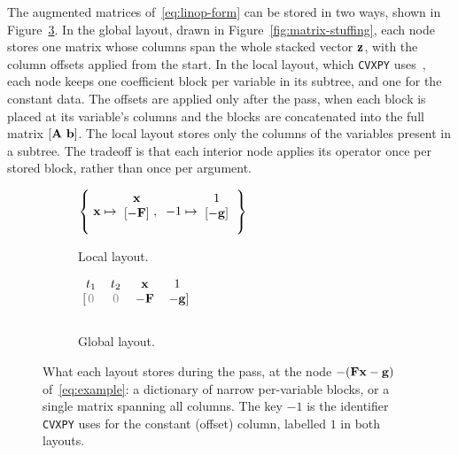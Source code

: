 The augmented matrices of~\eqref{eq:linop-form} can be stored in two ways,
shown in Figure~\ref{fig:local-vs-global}. In the global layout, drawn in
Figure~\ref{fig:matrix-stuffing}, each node stores one matrix whose columns span the whole
stacked vector $\mathbf{z}$, with the column offsets applied from the start. In the local
layout, which \texttt{CVXPY} uses~\cite{cvxpy2026source}, each node keeps one coefficient block
per variable in its
subtree, and one for the constant data. The offsets are applied only after the pass, when
each block is placed at its variable's columns and the blocks are concatenated into the full
matrix $[\mmat{A}\ \mvec{b}]$. The local layout stores only the columns of the variables
present in a subtree. The tradeoff is that each interior node applies its operator once per
stored block, rather than once per argument.

\begin{figure}[htbp]
\begin{subfigure}{0.48\textwidth}
\centering
$
\left\{\;
\mvec{x} \mapsto
\begin{blockarray}{c}
\mvec{x} \\
\begin{block}{[c]}
-\mmat{F} \\
\end{block}
\end{blockarray}
,\;\;
-1 \mapsto
\begin{blockarray}{c}
1 \\
\begin{block}{[c]}
-\mvec{g} \\
\end{block}
\end{blockarray}
\;\right\}
$
\caption{Local layout.}
\label{fig:local-layout}
\end{subfigure}
\hfill
\begin{subfigure}{0.48\textwidth}
\centering
$
\begin{blockarray}{cccc}
t_1        & t_2        & \mvec{x}  & 1  \\
\begin{block}{[cccc]}
\plotzero  & \plotzero  & -\mmat{F} & -\mvec{g} \\
\end{block}
\end{blockarray}
$
\caption{Global layout.}
\label{fig:global-layout}
\end{subfigure}
\caption{What each layout stores during the pass, at the node $-(\mathbf{F}\mathbf{x} - \mathbf{g})$
of~\eqref{eq:example}:
a dictionary of narrow per-variable blocks, or a single matrix spanning
all columns. The key $-1$ is the identifier \texttt{CVXPY} uses for the constant (offset)
column, labelled $1$ in both layouts.}
\label{fig:local-vs-global}
\end{figure}


